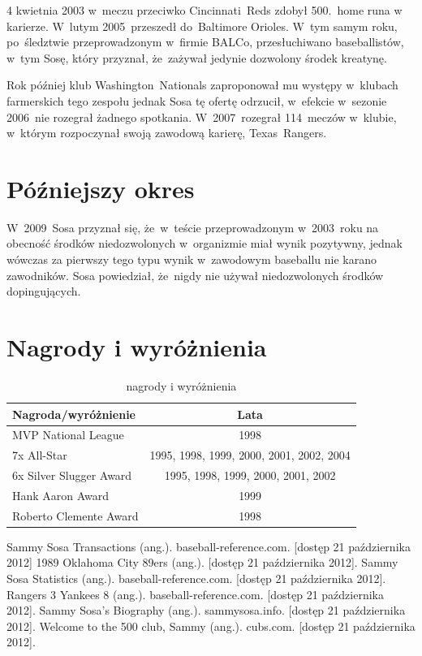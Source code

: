 \documentclass[a4paper,12pt]{article}
\begin{document}
4 kwietnia 2003 w~meczu przeciwko Cincinnati~Reds zdobył 500.~home runa w karierze. W~lutym 2005~przeszedł do~Baltimore Orioles. W~tym samym roku, po~śledztwie przeprowadzonym w~firmie BALCo, przesłuchiwano baseballistów, w~tym Sosę, który przyznał, że~zażywał jedynie dozwolony środek kreatynę.

Rok później klub Washington~Nationals zaproponował mu występy w~klubach farmerskich tego zespołu jednak Sosa tę ofertę odrzucił, w~efekcie w~sezonie 2006~nie rozegrał żadnego spotkania. W~2007~rozegrał 114~meczów w~klubie, w~którym rozpoczynał swoją zawodową karierę, Texas~Rangers.

\section{Późniejszy okres}
W~2009~Sosa przyznał się, że~w~teście przeprowadzonym w~2003~roku na obecność środków niedozwolonych w~organizmie miał wynik pozytywny, jednak wówczas za pierwszy tego typu wynik w~zawodowym baseballu nie karano zawodników. Sosa powiedział, że~nigdy nie używał niedozwolonych środków dopingujących.

\section{Nagrody i wyróżnienia}
\begin{table}[h]
	\begin{tabular}{lc}
	\textbf{Nagroda/wyróżnienie}&\textbf{Lata}\\
	\hline
	MVP National League&1998\\
	7x All-Star&1995{, }1998{, }1999{, }2000{, }2001{, }2002{, }2004\\
	6x Silver Slugger Award&1995{, }1998{, }1999{, }2000{, }2001{, }2002\\
	Hank Aaron Award&1999\\
	Roberto Clemente Award&1998\\
	\hline
	\end{tabular}
\caption{nagrody i wyróżnienia}
\end{table}

\begin{thebibliography}{6}
Sammy Sosa Transactions (ang.). baseball-reference.com. [dostęp 21 października 2012]
1989 Oklahoma City 89ers (ang.). [dostęp 21 października 2012].
Sammy Sosa Statistics (ang.). baseball-reference.com. [dostęp 21 października 2012].
Rangers 3 Yankees 8 (ang.). baseball-reference.com. [dostęp 21 października 2012].
Sammy Sosa's Biography (ang.). sammysosa.info. [dostęp 21 października 2012].
Welcome to the 500 club, Sammy (ang.). cubs.com. [dostęp 21 października 2012].
\end{thebibliography}
\end{document}
